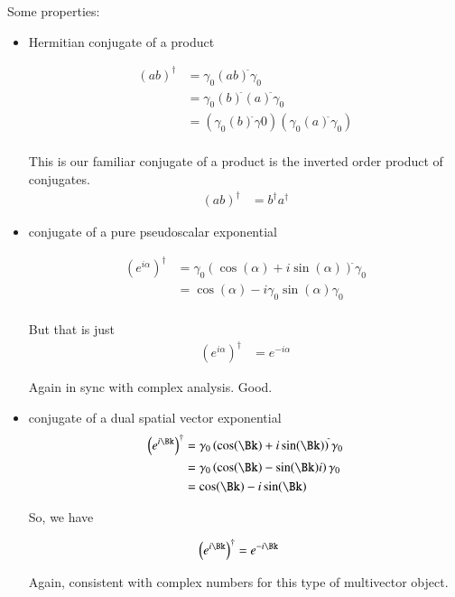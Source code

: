 Some properties:
\begin{itemize}
\item Hermitian conjugate of a product

\begin{align*}
(ab)^\dagger 
&= \gamma_0 (ab)^{\tilde{}} \gamma_0 \\
&= \gamma_0 
(b)^{\tilde{}}
(a)^{\tilde{}}
\gamma_0 \\
&= \left(\gamma_0 (b)^{\tilde{}} \gamma0\right) \left(\gamma_0 (a)^{\tilde{}} \gamma_0\right) \\
\end{align*}

This is our familiar conjugate of a product is the inverted order product of conjugates.
\begin{align}
(ab)^\dagger &= b^\dagger a^\dagger 
\end{align}

\item conjugate of a pure pseudoscalar exponential

\begin{align*}
\left(e^{i\alpha}\right)^\dagger
&=
\gamma_0
\left(
\cos(\alpha)
+ i \sin(\alpha)
\right)^{\tilde{}}
\gamma_0 \\
&=
\cos(\alpha)
- i 
\gamma_0
\sin(\alpha)
\gamma_0 \\
\end{align*}

But that is just
\begin{align}
\left(e^{i\alpha}\right)^\dagger &= e^{-i\alpha}
\end{align}

Again in sync with complex analysis.  Good.

\item conjugate of a dual spatial vector exponential
\begin{align*}
\left(e^{i\Bk}\right)^\dagger
&=
\gamma_0
\left(
\cos(\Bk)
+ i \sin(\Bk)
\right)^{\tilde{}}
\gamma_0 \\
&=
\gamma_0
\left(
\cos(\Bk)
- \sin(\Bk) i
\right)
\gamma_0 \\
&=
\cos(\Bk)
- i\sin(\Bk) 
\end{align*}

So, we have

\begin{align}
\left(e^{i\Bk}\right)^\dagger &= e^{-i\Bk}
\end{align}

Again, consistent with complex numbers for this type of multivector object.


\end{itemize}
